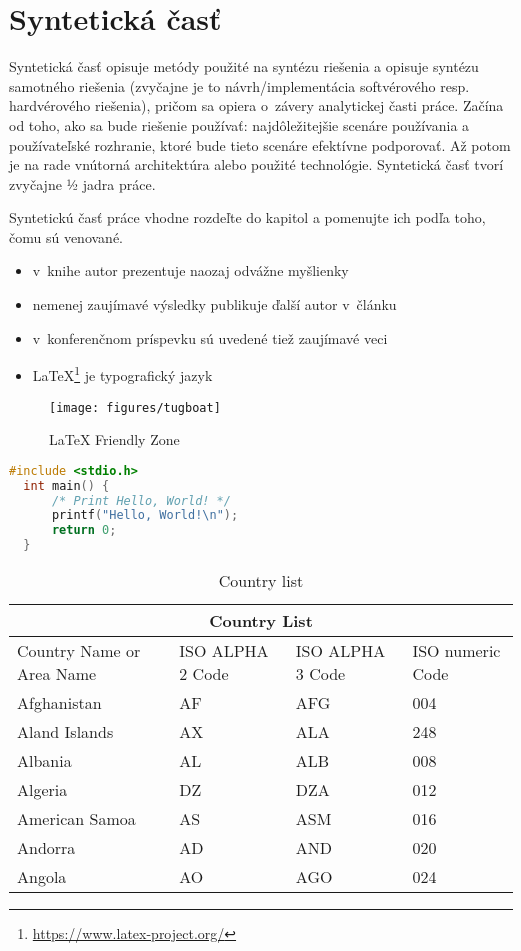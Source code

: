 
\chapter{Syntetická časť}
\label{methodology}

Syntetická časť opisuje metódy použité na syntézu riešenia a opisuje syntézu samotného riešenia (zvyčajne je to návrh/implementácia softvérového resp. hardvérového riešenia), pričom sa opiera o~závery analytickej časti práce. Začína od toho, ako sa bude riešenie používať: najdôležitejšie scenáre používania a používateľské rozhranie, ktoré bude tieto scenáre efektívne podporovať. Až potom je na rade vnútorná architektúra alebo použité technológie. Syntetická časť tvorí zvyčajne ½ jadra práce.

Syntetickú časť práce vhodne rozdeľte do kapitol a pomenujte ich podľa toho, čomu sú venované.

\begin{itemize}
  \item v~knihe \cite{book} autor prezentuje naozaj odvážne myšlienky
  \item nemenej zaujímavé výsledky publikuje ďalší autor v~článku \cite{article} 
  \item v~konferenčnom príspevku \cite{conference} sú uvedené tiež zaujímavé veci
  \item \LaTeX{}\footnote{\url{https://www.latex-project.org/}} je typografický jazyk
\end{itemize}

\begin{figure}[!ht]
  \centering
  \texttt{[image: figures/tugboat]}
  \caption{\LaTeX{} Friendly Zone \label{o:latex_friendly_zone}}
\end{figure}


\begin{lstlisting}[language=C,caption={Program, ktorý pozdraví celý svet}]
  #include <stdio.h>
  int main() {
      /* Print Hello, World! */
      printf("Hello, World!\n");
      return 0;
  }
  \end{lstlisting}


  
\begin{table}[!ht]
	\caption{Country list}\label{t:1}
	\smallskip
	\centering

	\begin{tabular}{ |p{3cm}||p{3cm}|p{3cm}|p{3cm}|  }
		\hline
		\multicolumn{4}{|c|}{Country List} \\
		\hline
		Country Name or Area Name& ISO ALPHA 2 Code &ISO ALPHA 3 Code&ISO numeric Code\\
		\hline
		Afghanistan & AF & AFG & 004\\
		Aland Islands & AX & ALA & 248\\
		Albania & AL & ALB & 008\\
		Algeria & DZ & DZA & 012\\
		American Samoa & AS & ASM & 016\\
		Andorra & AD & AND & 020\\
		Angola & AO & AGO & 024\\
		\hline
	\end{tabular}
\end{table}
